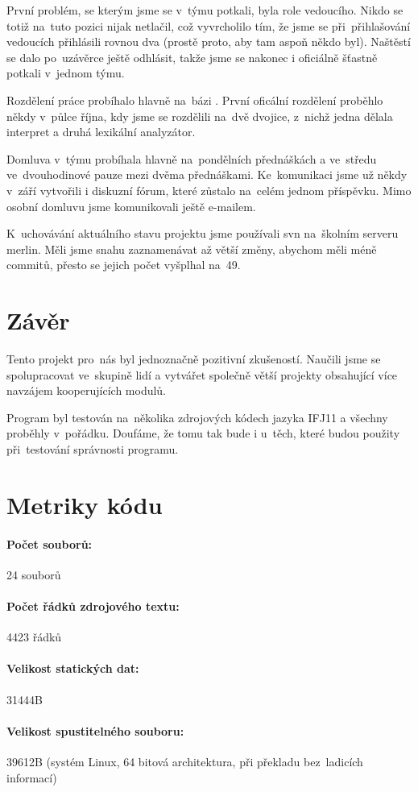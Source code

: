 \documentclass[12pt,a4paper,titlepage,final]{article}
\begin{document}
První problém, se kterým jsme se v~týmu potkali, byla role vedoucího.
Nikdo se totiž na~tuto pozici nijak netlačil, což vyvrcholilo tím, že jsme se
při~přihlašování vedoucích přihlásili rovnou dva (prostě proto, aby tam aspoň někdo byl).
Naštěstí se dalo po~uzávěrce ještě odhlásit, takže jsme se nakonec i oficiálně šťastně
potkali v~jednom týmu.

Rozdělení práce probíhalo hlavně na~bázi .
První oficální rozdělení proběhlo někdy v~půlce října, kdy jsme se rozdělili na~dvě
dvojice, z~nichž jedna dělala interpret a druhá lexikální analyzátor.

Domluva v~týmu probíhala hlavně na~pondělních přednáškách a ve~středu ve~dvouhodinové
pauze mezi dvěma přednáškami. Ke~komunikaci jsme už někdy v~září vytvořili i diskuzní
fórum, které zůstalo na~celém jednom příspěvku. Mimo osobní domluvu jsme komunikovali
ještě \mbox{e-mailem}.

K~uchovávání aktuálního stavu projektu jsme používali svn na~školním serveru merlin.
Měli jsme snahu zaznamenávat až větší změny, abychom měli méně commitů, přesto se jejich
počet vyšplhal na~49.

\section{Závěr}

Tento projekt pro~nás byl jednoznačně pozitivní zkušeností. Naučili jsme se spolupracovat
ve~skupině lidí a vytvářet společně větší projekty obsahující více navzájem kooperujících modulů.

Program byl testován na~několika zdrojových kódech jazyka IFJ11 a všechny proběhly v~pořádku.
Doufáme, že tomu tak bude i u~těch, které budou použity při~testování správnosti programu.
\appendix

\section{Metriky kódu} \label{metriky}
\paragraph{Počet souborů:} 24 souborů
\paragraph{Počet řádků zdrojového textu:} 4423 řádků
\paragraph{Velikost statických dat:} 31444B
\paragraph{Velikost spustitelného souboru:} 39612B (systém Linux, 64 bitová
architektura, při pře\-kla\-du bez~ladicích informací)
\end{document}
